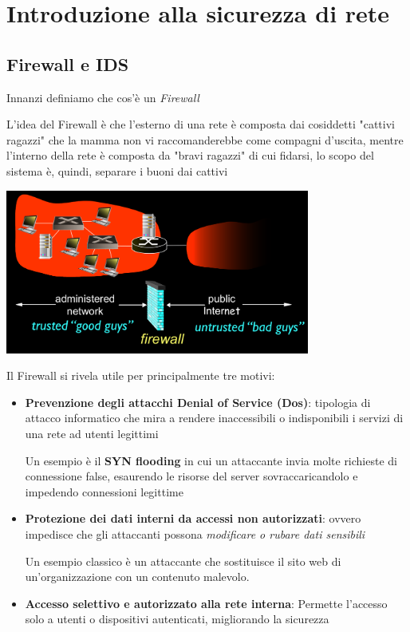 \chapter{Introduzione alla sicurezza di rete}

\section{Firewall e IDS}

Innanzi definiamo che cos'è un \textit{Firewall}


L'idea del Firewall è che l'esterno di una rete è composta dai cosiddetti "cattivi ragazzi" che la mamma non vi raccomanderebbe come compagni d'uscita, mentre l'interno della rete è composta da "bravi ragazzi" di cui fidarsi, lo scopo del sistema è, quindi, separare i buoni dai cattivi

\begin{center}
    \includegraphics[width=10cm]{img/buoni_cattivi_e_firewall.png}
\end{center}

Il Firewall si rivela utile per principalmente tre motivi:
\begin{itemize}
    \item \textbf{Prevenzione degli attacchi Denial of Service (Dos)}: tipologia di attacco informatico che mira a rendere inaccessibili o indisponibili i servizi di una rete ad utenti legittimi
    
    Un esempio è il \textbf{SYN flooding} in cui un attaccante invia molte richieste di connessione false, esaurendo le risorse del server sovraccaricandolo e impedendo connessioni legittime

    \item \textbf{Protezione dei dati interni da accessi non autorizzati}: ovvero impedisce che gli attaccanti possona \textit{modificare o rubare dati sensibili}
    
    Un esempio classico è un attaccante che sostituisce il sito web di un'organizzazione con un contenuto malevolo.

    \item \textbf{Accesso selettivo e autorizzato alla rete interna}: Permette l’accesso solo a utenti o dispositivi autenticati, migliorando la sicurezza
\end{itemize}

